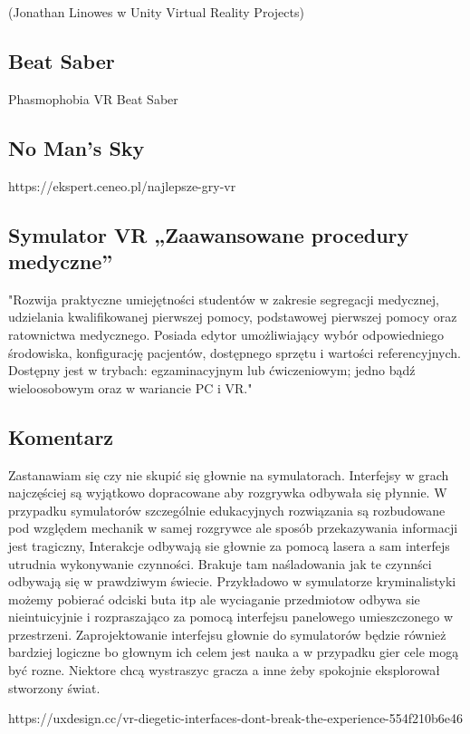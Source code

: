 (Jonathan Linowes w Unity Virtual Reality Projects)



\subsection{Beat Saber}
Phasmophobia VR
Beat Saber

\subsection{No Man's Sky}

https://ekspert.ceneo.pl/najlepsze-gry-vr


\subsection{Symulator VR „Zaawansowane procedury medyczne”
}
"Rozwija praktyczne umiejętności studentów w zakresie segregacji medycznej, udzielania kwalifikowanej pierwszej pomocy, podstawowej pierwszej pomocy oraz ratownictwa medycznego. Posiada edytor umożliwiający wybór odpowiedniego środowiska, konfigurację pacjentów, dostępnego sprzętu i wartości referencyjnych. Dostępny jest w trybach: egzaminacyjnym lub ćwiczeniowym; jedno bądź wieloosobowym oraz w wariancie PC i VR."



\subsection{Komentarz}
Zastanawiam się czy nie skupić się głownie na symulatorach. Interfejsy w grach najczęściej są wyjątkowo dopracowane aby rozgrywka odbywała się płynnie. W przypadku symulatorów szczególnie edukacyjnych rozwiązania są rozbudowane pod względem mechanik w samej rozgrywce ale sposób przekazywania informacji jest tragiczny, Interakcje odbywają sie głownie za pomocą lasera a sam interfejs utrudnia wykonywanie czynności. Brakuje tam naśladowania jak te czynnści odbywają się w prawdziwym świecie. Przykładowo w symulatorze kryminalistyki możemy pobierać odciski buta itp ale wyciaganie przedmiotow odbywa sie nieintuicyjnie i rozpraszająco za pomocą interfejsu panelowego umieszczonego w przestrzeni. Zaprojektowanie interfejsu głownie do symulatorów będzie również bardziej logiczne bo głownym ich celem jest nauka a w przypadku gier cele mogą być rozne. Niektore chcą wystraszyc gracza a inne żeby spokojnie eksplorował stworzony świat.

https://uxdesign.cc/vr-diegetic-interfaces-dont-break-the-experience-554f210b6e46



